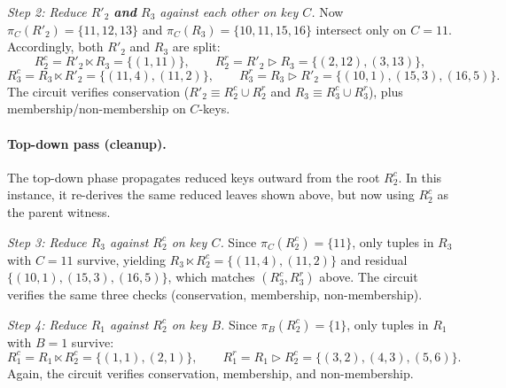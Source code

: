 \documentclass[sigconf]{acmart}
\renewcommand{\emph}[1]{\textit{#1}}
\begin{document}
\begin{example}
\smallskip
\noindent\emph{Step 2: Reduce $R'_2$ \textbf{and} $R_3$ against each other on key $C$.}
Now $\pi_C(R'_2)=\{11,12,13\}$ and $\pi_C(R_3)=\{10,11,15,16\}$ intersect only on $C=11$.
Accordingly, both $R'_2$ and $R_3$ are split:
%
\[
R_2^{c} = R'_2 \ltimes R_3 = \{(1,11)\}, \qquad
R_2^{r} = R'_2 \rhd R_3 = \{(2,12),(3,13)\},
\]
\vspace{-0.1in}
\[
R_3^{c} = R_3 \ltimes R'_2 = \{(11,4),(11,2)\},\qquad
R_3^{r} = R_3 \rhd R'_2 = \{(10,1),(15,3),(16,5)\}.
\]
The circuit verifies conservation
($R'_2 \equiv R_2^{c}\cup R_2^{r}$ and
$R_3 \equiv R_3^{c}\cup R_3^{r}$),
plus membership/non-membership on $C$-keys.

\vspace{-0.1in}
\paragraph{Top-down pass (cleanup).}
The top-down phase propagates reduced keys outward from the root $R_2^{c}$.
In this instance, it re-derives the same reduced leaves shown above, but now using $R_2^{c}$ as the parent witness.

\smallskip
\noindent\emph{Step 3: Reduce $R_3$ against $R_2^c$ on key $C$.}
Since $\pi_C(R_2^c)=\{11\}$, only tuples in $R_3$ with $C=11$ survive, yielding
$R_3 \ltimes R_2^c = \{(11,4),(11,2)\}$ and residual $\{(10,1),(15,3),(16,5)\}$,
which matches $(R_3^{c},R_3^{r})$ above.
The circuit verifies the same three checks (conservation, membership, non-membership).

\smallskip
\noindent\emph{Step 4: Reduce $R_1$ against $R_2^c$ on key $B$.}
Since $\pi_B(R_2^c)=\{1\}$, only tuples in $R_1$ with $B=1$ survive:
\vspace{-0.1in}
\[
R_1^c = R_1 \ltimes R_2^c = \{(1,1),(2,1)\}, \qquad
R_1^{r} = R_1 \rhd R_2^c = \{(3,2),(4,3),(5,6)\}.
\]
\vspace{-0.1in}
Again, the circuit verifies conservation, membership, and non-membership.



\end{example}
\end{document}
